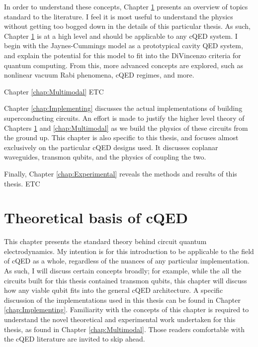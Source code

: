 \documentclass[11 pt, oneside]{book} %
\begin{document}
In order to understand these concepts, Chapter \ref{chap:Theoretical} presents an overview of topics standard to the literature. I feel it is most useful to understand the physics without getting too bogged down in the details of this particular thesis. As such, Chapter \ref{chap:Theoretical} is at a high level and should be applicable to any cQED system. I begin with the Jaynes-Cummings model as a prototypical cavity QED system, and explain the potential for this model to fit into the DiVincenzo criteria for quantum computing. From this, more advanced concepts are explored, such as nonlinear vacuum Rabi phenomena, cQED regimes, and more. 

Chapter \ref{chap:Multimodal} ETC

Chapter \ref{chap:Implementing} discusses the actual implementations of building superconducting circuits. An effort is made to justify the higher level theory of Chapters \ref{chap:Theoretical} and \ref{chap:Multimodal} as we build the physics of these circuits from the ground up. This chapter is also specific to this thesis, and focuses almost exclusively on the particular cQED designs used. It discusses coplanar waveguides, transmon qubits, and the physics of coupling the two. 

Finally, Chapter \ref{chap:Experimental} reveals the methods and results of this thesis. ETC



\chapter{Theoretical basis of cQED}\label{chap:Theoretical}
This chapter presents the standard theory behind circuit quantum electrodynamics. My intention is for this introduction to be applicable to the field of cQED as a whole, regardless of the nuances of any particular implementation. As such, I will discuss certain concepts broadly; for example, while the all the circuits built for this thesis contained transmon qubits, this chapter will discuss how any viable qubit fits into the general cQED architecture. A specific discussion of the implementations used in this thesis can be found in Chapter \ref{chap:Implementing}. Familiarity with the concepts of this chapter is required to understand the novel theoretical and experimental work undertaken for this thesis, as found in Chapter \ref{chap:Multimodal}. Those readers comfortable with the cQED literature are invited to skip ahead. 
\end{document}
